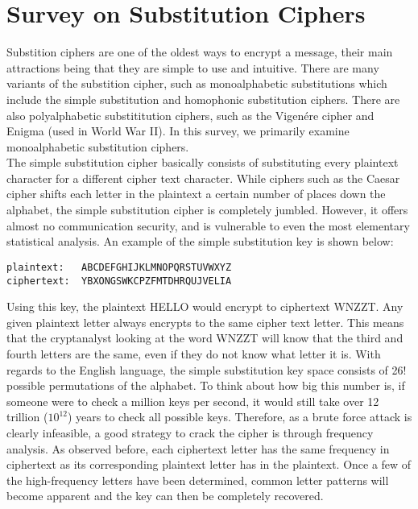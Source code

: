 \documentclass[a4paper,twoside,10pt]{report}
\begin{document}
\section{Survey on Substitution Ciphers}\label{ciphersurvey}

Substition ciphers are one of the oldest ways to encrypt a message, their main attractions being that they are simple to use and intuitive. There are many variants of the substition cipher, such as monoalphabetic substitutions which include the simple substitution and homophonic substitution ciphers. There are also polyalphabetic substititution ciphers, such as the Vigen\'ere cipher and Enigma (used in World War II). In this survey, we primarily examine monoalphabetic substitution ciphers. \\

The simple substitution cipher basically consists of substituting every plaintext character for a different cipher text character. While ciphers such as the Caesar cipher shifts each letter in the plaintext a certain number of places down the alphabet, the simple substitution cipher is completely jumbled. However, it offers almost no communication security, and is vulnerable to even the most elementary statistical analysis. An example of the simple substitution key is shown below:

\begin{lstlisting}
plaintext:   ABCDEFGHIJKLMNOPQRSTUVWXYZ
ciphertext:  YBXONGSWKCPZFMTDHRQUJVELIA
\end{lstlisting}

\vspace{4mm}
Using this key, the plaintext HELLO would encrypt to ciphertext WNZZT. Any given plaintext letter always encrypts to the same cipher text letter. This means that the cryptanalyst looking at the word WNZZT will know that the third and fourth letters are the same, even if they do not know what letter it is. With regards to the English language, the simple substitution key space consists of 26! possible permutations of the alphabet. To think about how big this number is, if someone were to check a million keys per second, it would still take over 12 trillion ($10^{12}$) years to check all possible keys. Therefore, as a brute force attack is clearly infeasible, a good strategy to crack the cipher is through frequency analysis. As observed before, each ciphertext letter has the same frequency in ciphertext as its corresponding plaintext letter has in the plaintext. Once a few of the high-frequency letters have been determined, common letter patterns will become apparent and the key can then be completely recovered.
\end{document}
